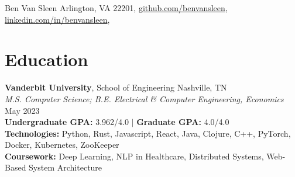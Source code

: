 \documentclass[10pt]{article}
\begin{document}
\resumeheader
{Ben Van Sleen}
{
	Arlington, VA 22201,
	\href{https://github.com/benvansleen}{github.com/benvansleen},
	\href{https://linkedin.com/in/benvansleen}{linkedin.com/in/benvansleen},
}

\section*{Education}
\textbf{Vanderbit University}, School of Engineering \hfill Nashville, TN \\
\hspace*{1em}\textit{M.S. Computer Science; B.E. Electrical \& Computer Engineering, Economics} \hfill May 2023 \\
\textbf{Undergraduate GPA:} 3.962/4.0 $\mid$ \textbf{Graduate GPA:} 4.0/4.0 \\
\textbf{Technologies:} Python, Rust, Javascript, React, Java, Clojure, C++, PyTorch, Docker, Kubernetes, ZooKeeper \\
\textbf{Coursework:} Deep Learning, NLP in Healthcare, Distributed Systems, Web-Based System Architecture
\end{document}
